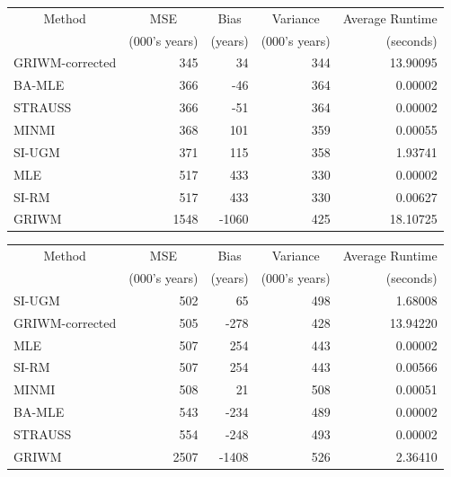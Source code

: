 \documentclass[
]{article}
\begin{document}
\begin{tabular}{lrrrr}
\toprule
\multicolumn{1}{c}{Method} & \multicolumn{1}{c}{MSE} & \multicolumn{1}{c}{Bias} & \multicolumn{1}{c}{Variance} & \multicolumn{1}{c}{Average Runtime} \\
\cmidrule(l{3pt}r{3pt}){1-1} \cmidrule(l{3pt}r{3pt}){2-2} \cmidrule(l{3pt}r{3pt}){3-3} \cmidrule(l{3pt}r{3pt}){4-4} \cmidrule(l{3pt}r{3pt}){5-5}
 & (000's years) & (years) & (000's years) & (seconds)\\
\midrule
GRIWM-corrected & 345 & 34 & 344 & 13.90095\\
BA-MLE & 366 & -46 & 364 & 0.00002\\
STRAUSS & 366 & -51 & 364 & 0.00002\\
MINMI & 368 & 101 & 359 & 0.00055\\
SI-UGM & 371 & 115 & 358 & 1.93741\\
\addlinespace
MLE & 517 & 433 & 330 & 0.00002\\
SI-RM & 517 & 433 & 330 & 0.00627\\
GRIWM & 1548 & -1060 & 425 & 18.10725\\
\bottomrule
\end{tabular}

\begin{tabular}{lrrrr}
\toprule
\multicolumn{1}{c}{Method} & \multicolumn{1}{c}{MSE} & \multicolumn{1}{c}{Bias} & \multicolumn{1}{c}{Variance} & \multicolumn{1}{c}{Average Runtime} \\
\cmidrule(l{3pt}r{3pt}){1-1} \cmidrule(l{3pt}r{3pt}){2-2} \cmidrule(l{3pt}r{3pt}){3-3} \cmidrule(l{3pt}r{3pt}){4-4} \cmidrule(l{3pt}r{3pt}){5-5}
 & (000's years) & (years) & (000's years) & (seconds)\\
\midrule
SI-UGM & 502 & 65 & 498 & 1.68008\\
GRIWM-corrected & 505 & -278 & 428 & 13.94220\\
MLE & 507 & 254 & 443 & 0.00002\\
SI-RM & 507 & 254 & 443 & 0.00566\\
MINMI & 508 & 21 & 508 & 0.00051\\
\addlinespace
BA-MLE & 543 & -234 & 489 & 0.00002\\
STRAUSS & 554 & -248 & 493 & 0.00002\\
GRIWM & 2507 & -1408 & 526 & 2.36410\\
\bottomrule
\end{tabular}
\end{document}
